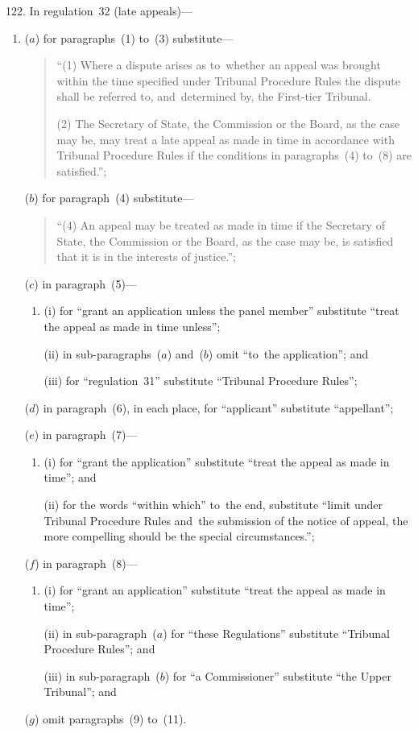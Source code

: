 \documentclass[12pt,a4paper]{article}
\begin{document}
\medskip

122.  In regulation~32 (late appeals)—
\begin{enumerate}\item[]
($a$) for paragraphs~(1) to~(3) substitute—
\begin{quotation}
“(1) Where a dispute arises as to~whether an appeal was brought within the time specified under Tribunal Procedure Rules the dispute shall be referred to, and~determined by, the First-tier Tribunal.

(2) The Secretary of State, the Commission or the Board, as the case may be, may treat a late appeal as made in time in accordance with Tribunal Procedure Rules if the conditions in paragraphs~(4) to~(8) are satisfied.”;
\end{quotation}

($b$) for paragraph~(4) substitute—
\begin{quotation}
“(4) An appeal may be treated as made in time if the Secretary of State, the Commission or the Board, as the case may be, is satisfied that it is in the interests of justice.”;
\end{quotation}

($c$) in paragraph~(5)—
\begin{enumerate}\item[]
(i) for “grant an application unless the panel member” substitute “treat the appeal as made in time unless”;

(ii) in sub-paragraphs~($a$)  and~($b$)  omit “to~the application”; and

(iii) for “regulation~31” substitute “Tribunal Procedure Rules”;
\end{enumerate}

($d$) in paragraph~(6), in each place, for “applicant” substitute “appellant”;

($e$) in paragraph~(7)—
\begin{enumerate}\item[]
(i) for “grant the application” substitute “treat the appeal as made in time”; and

(ii) for the words “within which” to~the end, substitute “limit under Tribunal Procedure Rules and~the submission of the notice of appeal, the more compelling should be the special circumstances.”;
\end{enumerate}

($f$) in paragraph~(8)—
\begin{enumerate}\item[]
(i) for “grant an application” substitute “treat the appeal as made in time”;

(ii) in sub-paragraph~($a$)  for “these Regulations” substitute “Tribunal Procedure Rules”; and

(iii) in sub-paragraph~($b$)  for “a Commissioner” substitute “the Upper Tribunal”; and
\end{enumerate}

($g$) omit paragraphs~(9) to~(11).
\end{enumerate}
\end{document}
